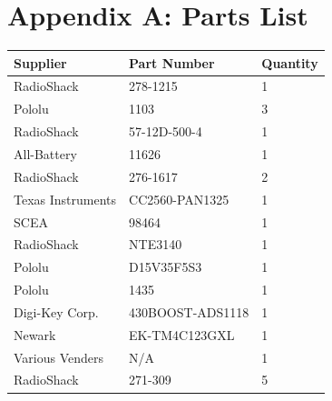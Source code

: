 \documentclass[11pt]{report}
\begin{document}
\begin{spacing}{1.5}
\begin{table}[H]
\begin{tabular}{lllll}
\end{tabular}
\end{table}

{}

\clearpage

\section*{Appendix A: Parts List}

\begin{table}[H]

\begin{tabular}{lll}
\toprule

Supplier & Part Number & Quantity \\
\midrule
RadioShack & 278-1215 & 1 \\
Pololu & 	1103	 & 3 \\
RadioShack & 57-12D-500-4 & 	1 \\
All-Battery & 	11626	 & 1 \\
RadioShack & 276-1617 & 2 \\
Texas Instruments & 	CC2560-PAN1325 & 	1 \\
SCEA & 	98464	 & 1 \\
RadioShack & NTE3140 & 1 \\
Pololu & 	 D15V35F5S3	 & 1 \\
Pololu & 	1435	 & 1 \\
Digi-Key Corp. & 	430BOOST-ADS1118 & 	1 \\
Newark & 	 EK-TM4C123GXL	 & 1 \\
Various Venders & 	N/A & 	1 \\
RadioShack & 271-309 & 5 \\
 \bottomrule
\end{tabular}
\end{table}



\end{spacing}
\end{document}
